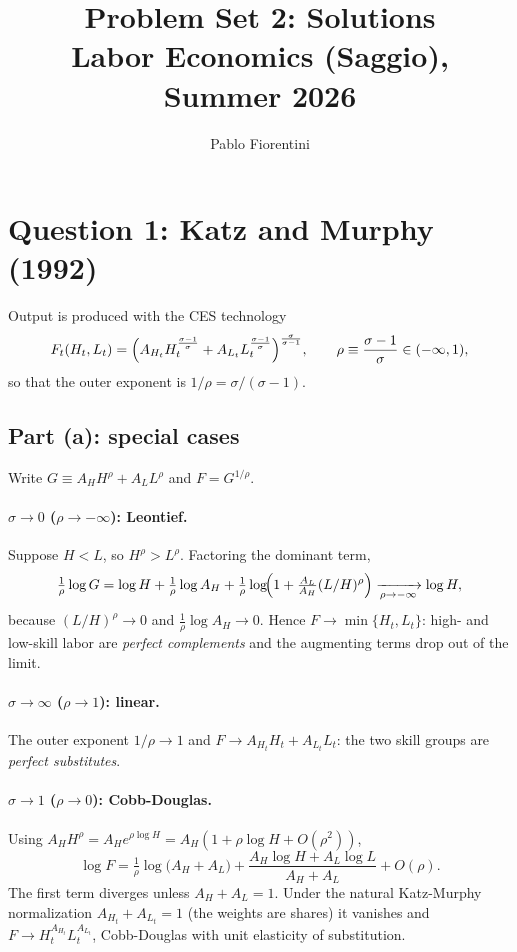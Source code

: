 \documentclass[11pt]{article}
\title{Problem Set 2: Solutions\\
\large Labor Economics (Saggio), Summer 2026}
\author{Pablo Fiorentini}
\date{}
\begin{document}
\maketitle

\section*{Question 1: Katz and Murphy (1992)}

Output is produced with the CES technology
\begin{equation}
F_{t}(H_{t},L_{t})=\Bigl(A_{H_t}H_{t}^{\frac{\sigma-1}{\sigma}}
   +A_{L_t}L_{t}^{\frac{\sigma-1}{\sigma}}\Bigr)^{\frac{\sigma}{\sigma-1}},
\qquad \rho\equiv\frac{\sigma-1}{\sigma}\in(-\infty,1),
\end{equation}
so that the outer exponent is $1/\rho=\sigma/(\sigma-1)$.

\subsection*{Part (a): special cases}

Write $G\equiv A_{H}H^{\rho}+A_{L}L^{\rho}$ and $F=G^{1/\rho}$.

\paragraph{$\sigma\rightarrow0$ ($\rho\rightarrow-\infty$): Leontief.} Suppose $H<L$, so
$H^{\rho}>L^{\rho}$. Factoring the dominant term,
\[
\tfrac1\rho\log G=\log H+\tfrac1\rho\log A_{H}
   +\tfrac1\rho\log\!\Bigl(1+\tfrac{A_{L}}{A_{H}}(L/H)^{\rho}\Bigr)
   \xrightarrow[\rho\rightarrow-\infty]{}\log H,
\]
because $(L/H)^{\rho}\rightarrow0$ and $\tfrac1\rho\log A_{H}\rightarrow0$. Hence
$\boxed{F\rightarrow\min\{H_{t},L_{t}\}}$: high- and low-skill labor are
\emph{perfect complements} and the augmenting terms drop out of the limit.

\paragraph{$\sigma\rightarrow\infty$ ($\rho\rightarrow1$): linear.} The outer exponent
$1/\rho\rightarrow1$ and $\boxed{F\rightarrow A_{H_t}H_{t}+A_{L_t}L_{t}}$: the two skill
groups are \emph{perfect substitutes}.

\paragraph{$\sigma\rightarrow1$ ($\rho\rightarrow0$): Cobb-Douglas.} Using
$A_{H}H^{\rho}=A_{H}e^{\rho\log H}=A_{H}(1+\rho\log H+O(\rho^{2}))$,
\[
\log F=\tfrac1\rho\log\!\bigl(A_{H}+A_{L}\bigr)
  +\frac{A_{H}\log H+A_{L}\log L}{A_{H}+A_{L}}+O(\rho).
\]
The first term diverges unless $A_{H}+A_{L}=1$. Under the natural Katz-Murphy
normalization $A_{H_t}+A_{L_t}=1$ (the weights are shares) it vanishes and
$\boxed{F\rightarrow H_{t}^{A_{H_t}}L_{t}^{A_{L_t}}}$, Cobb-Douglas with
unit elasticity of substitution.
\end{document}
